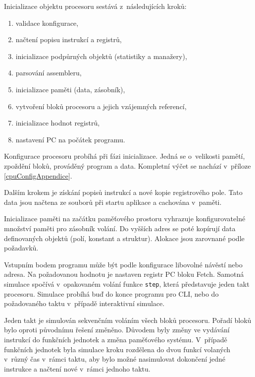 Inicializace objektu procesoru sestává z~následujících kroků:
\begin{enumerate}
    \item validace konfigurace,
    \item načtení popisu instrukcí a registrů,
    \item inicializace podpůrných objektů (statistiky a manažery),
    \item parsování assembleru,
    \item inicializace paměti (data, zásobník),
    \item vytvoření bloků procesoru a jejich vzájemných referencí,
    \item inicializace hodnot registrů,
    \item nastavení PC na počátek programu.
\end{enumerate}

Konfigurace procesoru probíhá při fázi inicializace.
Jedná se o~velikosti pamětí, zpoždění bloků, prováděný program a data.
Kompletní výčet se nachází v~příloze \ref{cpuConfigAppendice}.

Dalším krokem je získání popisů instrukcí a nové kopie registrového pole.
Tato data jsou načtena ze souborů při startu aplikace a cachována v~paměti.

Inicializace paměti na začátku paměťového prostoru vyhrazuje konfigurovatelné množství paměti pro zásobník volání.
Do vyšších adres se poté kopírují data definovaných objektů (polí, konstant a struktur).
Alokace jsou zarovnané podle požadavků.

Vstupním bodem programu může být podle konfigurace libovolné návěstí nebo adresa.
Na požadovanou hodnotu je nastaven registr PC bloku Fetch.
Samotná simulace spočívá v~opakovaném volání funkce \texttt{step}, která představuje jeden takt procesoru.
Simulace probíhá buď do konce programu pro CLI, nebo do požadovaného taktu v~případě interaktivní simulace.

Jeden takt je simulován sekvenčním voláním všech bloků procesoru.
Pořadí bloků bylo oproti původnímu řešení změněno.
Důvodem byly změny ve vydávání instrukcí do funkčních jednotek a změna paměťového systému.
V~případě funkčních jednotek byla simulace kroku rozdělena do dvou funkcí volaných v~různý čas v~rámci taktu, aby bylo možné nasimulovat dokončení jedné instrukce a načtení nové v~rámci jednoho taktu.

